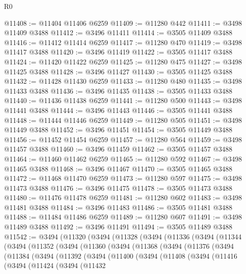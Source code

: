 \begin{lexlean}{R0}
\begin{coremodule}
@11408 := @11404 @11406 @6259
@11409 := @11280 @442
@11411 := @3498 @11409 @3488
@11412 := @3496 @11411
@11414 := @3505 @11409 @3488
@11416 := @11412 @11414 @6259
@11417 := @11280 @470
@11419 := @3498 @11417 @3488
@11420 := @3496 @11419
@11422 := @3505 @11417 @3488
@11424 := @11420 @11422 @6259
@11425 := @11280 @475
@11427 := @3498 @11425 @3488
@11428 := @3496 @11427
@11430 := @3505 @11425 @3488
@11432 := @11428 @11430 @6259
@11433 := @11280 @480
@11435 := @3498 @11433 @3488
@11436 := @3496 @11435
@11438 := @3505 @11433 @3488
@11440 := @11436 @11438 @6259
@11441 := @11280 @500
@11443 := @3498 @11441 @3488
@11444 := @3496 @11443
@11446 := @3505 @11441 @3488
@11448 := @11444 @11446 @6259
@11449 := @11280 @505
@11451 := @3498 @11449 @3488
@11452 := @3496 @11451
@11454 := @3505 @11449 @3488
@11456 := @11452 @11454 @6259
@11457 := @11280 @564
@11459 := @3498 @11457 @3488
@11460 := @3496 @11459
@11462 := @3505 @11457 @3488
@11464 := @11460 @11462 @6259
@11465 := @11280 @592
@11467 := @3498 @11465 @3488
@11468 := @3496 @11467
@11470 := @3505 @11465 @3488
@11472 := @11468 @11470 @6259
@11473 := @11280 @597
@11475 := @3498 @11473 @3488
@11476 := @3496 @11475
@11478 := @3505 @11473 @3488
@11480 := @11476 @11478 @6259
@11481 := @11280 @602
@11483 := @3498 @11481 @3488
@11484 := @3496 @11483
@11486 := @3505 @11481 @3488
@11488 := @11484 @11486 @6259
@11489 := @11280 @607
@11491 := @3498 @11489 @3488
@11492 := @3496 @11491
@11494 := @3505 @11489 @3488
@11542 := @3494
    (@11320
      (@3494
        (@11328
          (@3494
            (@11336
              (@3494
                (@11344
                  (@3494
                    (@11352
                      (@3494
                        (@11360
                          (@3494
                            (@11368
                              (@3494
                                (@11376
                                  (@3494
                                    (@11384
                                      (@3494
                                        (@11392
                                          (@3494
                                            (@11400
                                              (@3494
                                                (@11408
                                                  (@3494
                                                    (@11416
                                                      (@3494
                                                        (@11424
                                                          (@3494
                                                            (@11432

\end{coremodule}
\end{lexlean}
